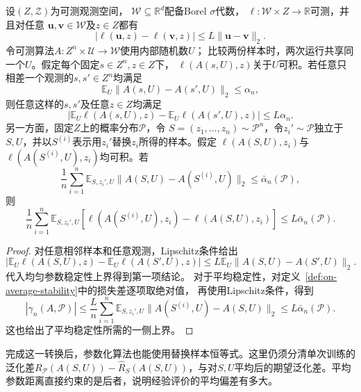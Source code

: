 \begin{theorem}[参数稳定性与损失稳定性]
\label{thm:parameter-to-loss-stability}
设$(Z,\mathcal Z)$为可测观测空间，
$\mathcal W\subseteq\mathbb R^d$配备Borel $\sigma$代数，
$\ell:\mathcal W\times Z\to\mathbb R$可测，并且对任意
$\bm u,\bm v\in\mathcal W$及$z\in Z$都有
\[
 |\ell(\bm u,z)-\ell(\bm v,z)|
 \leq L\|\bm u-\bm v\|_2.
\]
令可测算法$A:Z^n\times\mathcal U\to\mathcal W$使用内部随机数$U$；
比较两份样本时，两次运行共享同一个$U$。假定每个固定$s\in Z^n,z\in Z$下，
$\ell(A(s,U),z)$关于$U$可积。若任意只相差一个观测的$s,s'\in Z^n$均满足
\[
 \mathbb E_U\|A(s,U)-A(s',U)\|_2\leq\alpha_n,
\]
则任意这样的$s,s'$及任意$z\in Z$均满足
\[
 \left|\mathbb E_U\ell(A(s,U),z)-\mathbb E_U\ell(A(s',U),z)\right|
 \leq L\alpha_n.
\]
另一方面，固定$Z$上的概率分布$\mathcal P$，令
$S=(z_1,\ldots,z_n)\sim\mathcal P^n$，令$z_i'\sim\mathcal P$独立于
$S,U$，并以$S^{(i)}$表示用$z_i'$替换$z_i$所得的样本。假定
$\ell(A(S,U),z_i)$与$\ell(A(S^{(i)},U),z_i)$均可积。若
\[
 \frac1n\sum_{i=1}^n\mathbb E_{S,z_i',U}
 \|A(S,U)-A(S^{(i)},U)\|_2
 \leq\bar\alpha_n(\mathcal P),
\]
则
\[
 \frac1n\sum_{i=1}^n\mathbb E_{S,z_i',U}
 [\ell(A(S^{(i)},U),z_i)-\ell(A(S,U),z_i)]
 \leq L\bar\alpha_n(\mathcal P).
\]
\end{theorem}
\begin{proof}
对任意相邻样本和任意观测，Lipschitz条件给出
\[
 \left|\mathbb E_U\ell(A(S,U),z)-\mathbb E_U\ell(A(S',U),z)\right|
 \leq L\mathbb E_U\|A(S,U)-A(S',U)\|_2.
\]
代入均匀参数稳定性上界得到第一项结论。
对于平均稳定性，对定义~\ref{def:on-average-stability}中的损失差逐项取绝对值，
再使用Lipschitz条件，得到
\[
 |\gamma_n(A,\mathcal P)|
 \leq\frac Ln\sum_{i=1}^n\mathbb E_{S,z_i',U}
       \|A(S^{(i)},U)-A(S,U)\|_2
 \leq L\bar\alpha_n(\mathcal P).
\]
这也给出了平均稳定性所需的一侧上界。
\end{proof}

完成这一转换后，参数化算法也能使用替换样本恒等式。这里仍须分清单次训练的泛化差$R_{\mathcal P}(A(S,U))-\hat R_S(A(S,U))$，与对$S,U$平均后的期望泛化差。平均参数距离直接约束的是后者，说明经验评价的平均偏差有多大。

